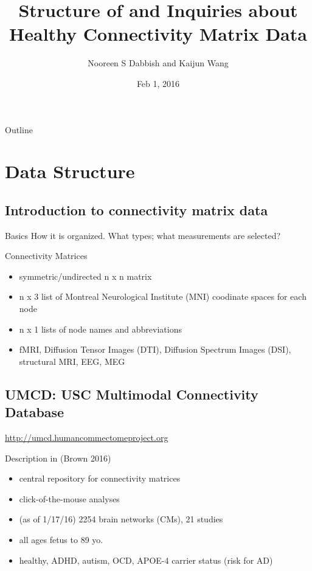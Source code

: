 \documentclass[bigger]{beamer}
\author{Nooreen S Dabbish and Kaijun Wang}
\date{Feb 1, 2016}
\title{Structure of and Inquiries about Healthy Connectivity Matrix Data}
\begin{document}
\maketitle
\begin{frame}{Outline}
\tableofcontents
\end{frame}


\section{Data Structure}
\label{sec-1}
\subsection{Introduction to connectivity matrix data}
\label{sec-1-1}
\begin{frame}[label=sec-1-1-1]{Basics}
How it is organized. What types; what measurements are selected?
\end{frame}
\begin{frame}[label=sec-1-1-2]{Connectivity Matrices}
\begin{itemize}
\item symmetric/undirected n x n matrix
\item n x 3 list of Montreal Neurological Institute (MNI) coodinate spaces for each node
\item n x 1 lists of node names and abbreviations

\item{} fMRI, Diffusion Tensor Images (DTI), Diffusion Spectrum Images (DSI), structural MRI, EEG, MEG
\end{itemize}
\end{frame}


\subsection{UMCD: USC Multimodal Connectivity Database}
\label{sec-1-2}
\url{http://umcd.humancommectomeproject.org}

\begin{frame}[label=sec-1-2-1]{Description in (Brown 2016)}
\begin{itemize}
\item central repository for connectivity matrices
\item click-of-the-mouse analyses
\item (as of 1/17/16) 2254 brain networks (CMs), 21 studies
\item all ages fetus to 89 yo.
\item healthy, ADHD, autism, OCD, APOE-4 carrier status (risk for AD)
\end{itemize}
\end{frame}
\end{document}

